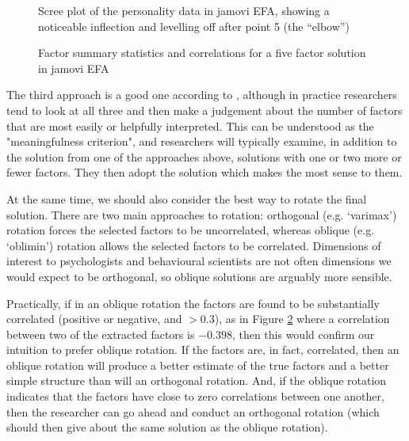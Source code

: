 \begin{figure}[!htb]
\begin{center}
\caption{Scree plot of the personality data in jamovi EFA, showing a noticeable inflection and levelling off after point 5 (the “elbow”)}
\label{fig:fa5}
\HR
\end{center}
\end{figure}

\begin{figure}[!htb]
\begin{center}
\caption{Factor summary statistics and correlations for a five factor solution in jamovi EFA}
\label{fig:fa6}
\HR
\end{center}
\end{figure}

The third approach is a good one according to \textcite{Fabrigar1999}, although in practice researchers tend to look at all three and then make a judgement about the number of factors that are most easily or helpfully interpreted. This can be understood as the "meaningfulness criterion", and researchers will typically examine, in addition to the solution from one of the approaches above, solutions with one or two more or fewer factors. They then adopt the solution which makes the most sense to them.

At the same time, we should also consider the best way to rotate the final solution. There are two main approaches to rotation: orthogonal (e.g. `varimax') rotation forces the selected factors to be uncorrelated, whereas oblique (e.g. `oblimin') rotation allows the selected factors to be correlated. Dimensions of interest to psychologists and behavioural scientists are not often dimensions we would expect to be orthogonal, so oblique solutions are arguably more sensible. 

Practically, if in an oblique rotation the factors are found to be substantially correlated (positive or negative, and $>0.3$), as in Figure \ref{fig:fa6} where a correlation between two of the extracted factors is $-0.398$, then this would confirm our intuition to prefer oblique rotation. If the factors are, in fact, correlated, then an oblique rotation will produce a better estimate of the true factors and a better simple structure than will an orthogonal rotation. And, if the oblique rotation indicates that the factors have close to zero correlations between one another, then the researcher can go ahead and conduct an orthogonal rotation (which should then give about the same solution as the oblique rotation).

